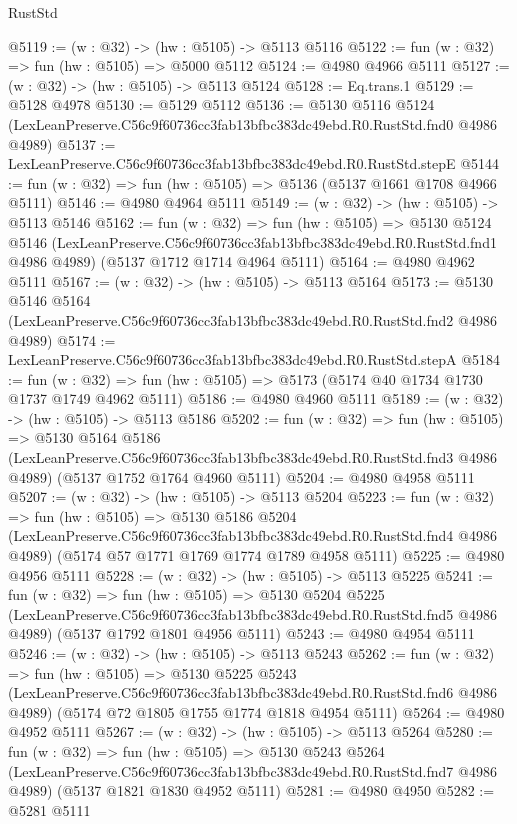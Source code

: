 \begin{lexlean}{RustStd}
\begin{coremodule}
@5119 := (w : @32) -> (hw : @5105) -> @5113 @5116
@5122 := fun (w : @32) => fun (hw : @5105) => @5000 @5112
@5124 := @4980 @4966 @5111
@5127 := (w : @32) -> (hw : @5105) -> @5113 @5124
@5128 := Eq.trans.{1}
@5129 := @5128 @4978
@5130 := @5129 @5112
@5136 := @5130
    @5116
    @5124
    (LexLeanPreserve.C56c9f60736cc3fab13bfbc383dc49ebd.R0.RustStd.fnd0 @4986 @4989)
@5137 := LexLeanPreserve.C56c9f60736cc3fab13bfbc383dc49ebd.R0.RustStd.stepE
@5144 := fun (w : @32) => fun (hw : @5105) => @5136 (@5137 @1661 @1708 @4966 @5111)
@5146 := @4980 @4964 @5111
@5149 := (w : @32) -> (hw : @5105) -> @5113 @5146
@5162 := fun (w : @32) =>
  fun (hw : @5105) =>
  @5130
    @5124
    @5146
    (LexLeanPreserve.C56c9f60736cc3fab13bfbc383dc49ebd.R0.RustStd.fnd1 @4986 @4989)
    (@5137 @1712 @1714 @4964 @5111)
@5164 := @4980 @4962 @5111
@5167 := (w : @32) -> (hw : @5105) -> @5113 @5164
@5173 := @5130
    @5146
    @5164
    (LexLeanPreserve.C56c9f60736cc3fab13bfbc383dc49ebd.R0.RustStd.fnd2 @4986 @4989)
@5174 := LexLeanPreserve.C56c9f60736cc3fab13bfbc383dc49ebd.R0.RustStd.stepA
@5184 := fun (w : @32) => fun (hw : @5105) => @5173 (@5174 @40 @1734 @1730 @1737 @1749 @4962 @5111)
@5186 := @4980 @4960 @5111
@5189 := (w : @32) -> (hw : @5105) -> @5113 @5186
@5202 := fun (w : @32) =>
  fun (hw : @5105) =>
  @5130
    @5164
    @5186
    (LexLeanPreserve.C56c9f60736cc3fab13bfbc383dc49ebd.R0.RustStd.fnd3 @4986 @4989)
    (@5137 @1752 @1764 @4960 @5111)
@5204 := @4980 @4958 @5111
@5207 := (w : @32) -> (hw : @5105) -> @5113 @5204
@5223 := fun (w : @32) =>
  fun (hw : @5105) =>
  @5130
    @5186
    @5204
    (LexLeanPreserve.C56c9f60736cc3fab13bfbc383dc49ebd.R0.RustStd.fnd4 @4986 @4989)
    (@5174 @57 @1771 @1769 @1774 @1789 @4958 @5111)
@5225 := @4980 @4956 @5111
@5228 := (w : @32) -> (hw : @5105) -> @5113 @5225
@5241 := fun (w : @32) =>
  fun (hw : @5105) =>
  @5130
    @5204
    @5225
    (LexLeanPreserve.C56c9f60736cc3fab13bfbc383dc49ebd.R0.RustStd.fnd5 @4986 @4989)
    (@5137 @1792 @1801 @4956 @5111)
@5243 := @4980 @4954 @5111
@5246 := (w : @32) -> (hw : @5105) -> @5113 @5243
@5262 := fun (w : @32) =>
  fun (hw : @5105) =>
  @5130
    @5225
    @5243
    (LexLeanPreserve.C56c9f60736cc3fab13bfbc383dc49ebd.R0.RustStd.fnd6 @4986 @4989)
    (@5174 @72 @1805 @1755 @1774 @1818 @4954 @5111)
@5264 := @4980 @4952 @5111
@5267 := (w : @32) -> (hw : @5105) -> @5113 @5264
@5280 := fun (w : @32) =>
  fun (hw : @5105) =>
  @5130
    @5243
    @5264
    (LexLeanPreserve.C56c9f60736cc3fab13bfbc383dc49ebd.R0.RustStd.fnd7 @4986 @4989)
    (@5137 @1821 @1830 @4952 @5111)
@5281 := @4980 @4950
@5282 := @5281 @5111

\end{coremodule}
\end{lexlean}
